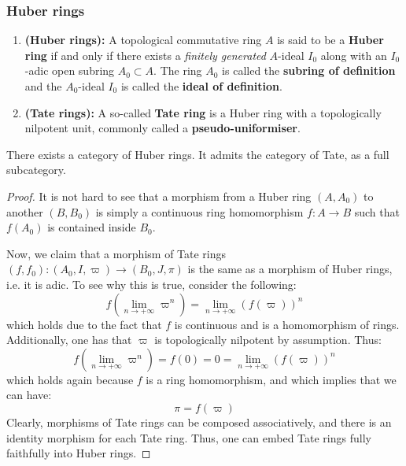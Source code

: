             \subsubsection{Huber rings}
                \begin{definition} \label{def: huber_rings_and_tate_rings}
                    \noindent
                    \begin{enumerate}
                        \item \textbf{(Huber rings):} A topological commutative ring $A$ is said to be a \textbf{Huber ring} if and only if there exists a \textit{finitely generated} $A$-ideal $I_0$ along with an $I_0$-adic open subring $A_0 \subset A$. The ring $A_0$ is called the \textbf{subring of definition} and the $A_0$-ideal $I_0$ is called the \textbf{ideal of definition}.
                        \item \textbf{(Tate rings):} A so-called \textbf{Tate ring} is a Huber ring with a topologically nilpotent unit, commonly called a \textbf{pseudo-uniformiser}. 
                    \end{enumerate}
                \end{definition}
                \begin{proposition} \label{prop: morphisms_of_huber_rings}
                    There exists a category of Huber rings. It admits the category of Tate, as a full subcategory.
                \end{proposition}
                    \begin{proof}
                        It is not hard to see that a morphism from a Huber ring $(A, A_0)$ to another $(B, B_0)$ is simply a continuous ring homomorphism $f: A \to B$ such that $f(A_0)$ is contained inside $B_0$. 
                        
                        Now, we claim that a morphism of Tate rings $(f, f_0): (A_0, I, \varpi) \to (B_0, J, \pi)$ is the same as a morphism of Huber rings, i.e. it is adic. To see why this is true, consider the following:
                            $$f\left(\underset{n \to +\infty}{\lim} \varpi^n \right) = \underset{n \to +\infty}{\lim} (f(\varpi))^n$$
                        which holds due to the fact that $f$ is continuous and is a homomorphism of rings. Additionally, one has that $\varpi$ is topologically nilpotent by assumption. Thus:
                            $$f\left(\underset{n \to +\infty}{\lim} \varpi^n \right) = f(0) = 0 = \underset{n \to +\infty}{\lim} (f(\varpi))^n$$
                        which holds again because $f$ is a ring homomorphism, and which implies that we can have:
                            $$\pi = f(\varpi)$$
                        Clearly, morphisms of Tate rings can be composed associatively, and there is an identity morphism for each Tate ring. Thus, one can embed Tate rings fully faithfully into Huber rings.
                    \end{proof}
                
